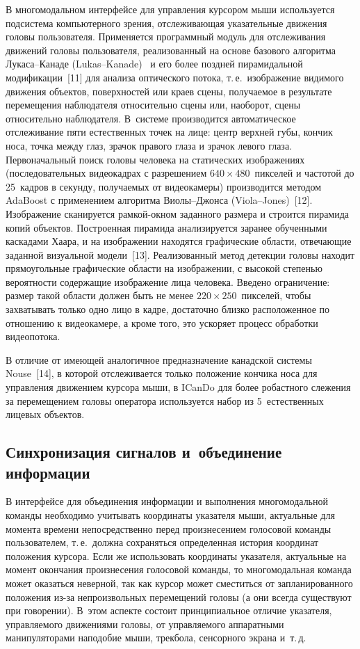 \begin{multicols}{2}
  В многомодальном интерфейсе для управления курсором мыши используется 
подсистема компьютер\-ного зрения, отслеживающая указательные движения 
головы пользователя. Применяется программный модуль для отслеживания 
движений головы пользователя, реализованный на основе базового алгоритма 
Лукаса--Канаде (Lukas--Kanade)~\cite{10kar} и его более поздней 
пирамидальной модификации~[11] для анализа оптического потока, т.\,е.\ 
изображение видимого движения объектов, поверхностей или краев сцены, 
получаемое в результате перемещения наблюдателя относительно сцены или, 
наоборот, сцены относительно наблюдателя. В~системе производится 
автоматическое отслеживание пяти естественных точек на лице: центр верхней 
губы, кончик носа, точка между глаз, зрачок правого глаза и зрачок левого 
глаза. Первоначальный поиск головы человека на статических изображениях 
(последовательных ви\-део\-кад\-рах с разрешением $640\times480$~пикселей и 
частотой до 25~кадров в секунду, получаемых от видеокамеры) производится 
методом AdaBoost с применением алгоритма Вио\-лы--Джон\-са 
  (Viola--Jones)~[12]. Изображение сканируется рамкой-окном заданного 
размера и строится пирамида копий объектов. Построенная пирамида 
анализируется заранее обучен\-ны\-ми каскадами Хаара, и на изображении 
находятся графические области, отвечающие заданной визуальной 
модели~[13]. Реализованный метод детекции головы находит прямоугольные 
графические области на изображении, с высокой степенью вероятности 
содержащие изображение лица человека. Введено ограничение: размер такой 
области должен быть не менее $220\times250$~пикселей, чтобы захватывать 
только одно лицо в кадре, достаточно близко расположенное по отношению к 
видеокамере, а кроме того, это ускоряет процесс обработки видеопотока. 
  
  В отличие от имеющей аналогичное предназначение канадской системы 
Nouse~[14], в которой отслеживается только положение кончика носа для 
управления движением курсора мыши, в ICanDo для более робастного 
слежения за перемещением головы оператора используется набор из 
5~естественных лицевых объектов.

\subsection{Синхронизация сигналов и~объединение информации}

  В интерфейсе для объединения информации и выполнения многомодальной 
команды необходимо учитывать координаты указателя мыши, актуальные для 
момента времени непосредственно\linebreak
 перед произнесением голосовой команды 
пользователем, т.\,е.\ должна сохраняться определенная история координат 
положения курсора. Если же использовать координаты указателя, актуальные 
на момент окончания произнесения голосовой команды, то многомодальная 
команда может оказаться неверной, так как курсор может сместиться от 
запланированного положения из-за непроизвольных перемещений головы (а 
они всегда существуют при говорении). В~этом аспекте состоит 
принципиальное отличие указателя, управляемого движениями головы, от 
управляемого аппаратными манипуляторами наподобие мыши, трекбола, 
сенсорного экрана и~т.\,д.
  

\end{multicols}
